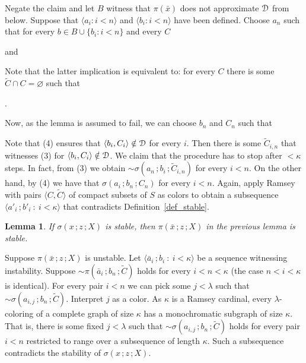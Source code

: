 \documentclass{amsproc}
\makeatletter
\newcounter{thm}
\theoremstyle{mio}
\newtheorem{lemma}[thm]{Lemma}\tcolorboxenvironment{lemma}{mythm}
\providecommand{\proofNameStyle}{\bfseries}
\renewenvironment{proof}[1][\proofname]{\par
  \pushQED{\qed}%
  \normalfont%
  \trivlist
  \item[\hskip\labelsep
        \proofNameStyle
    #1\@addpunct{.}]\ignorespaces
}{%
  \popQED\endtrivlist\@endpefalse
}
\makeatother
\begin{document}
\begin{proof}
  Negate the claim and let $B$ witness that $\pi(\bar x)$ does not approximate ${\EuScript D}$ from below.
  Suppose that $\langle a_i:i<n\rangle$ and $\langle b_i:i<n\rangle$ have been defined.
  Choose $a_n$ such that for every $b\in B\cup\{b_i:i<n\}$ and every $C$

  \quad and

  
  Note that the latter implication is equivalent to: for every $C$ there is some  $\tilde C\cap C=\varnothing$ such that 
  
  .%

  Now, as the lemma is assumed to fail, we can choose $b_n$ and $C_n$ such that


  Note that (4) ensures that $\langle b_i,C_i\rangle\notin{\EuScript D}$ for every $i$.
  Then there is some $\tilde C_{i,n}$ that witnesses (3) for $\langle b_i,C_i\rangle\notin{\EuScript D}$.
  We claim that the procedure has to stop after $<\kappa$ steps.
  In fact, from (3) we obtain ${\sim}\sigma(a_n\,;b_i\,;\tilde C_{i,n})$ for every $i<n$.
  On the other hand, by (4) we have that $\sigma(a_i\,;b_n\,;C_n)$ for every $i<n$.
  Again, apply Ramsey with pairs $\langle C,\tilde C\rangle$ of compact subsets of $S$ as colors to obtain a subsequence $\langle a'_i\,;b'_i\ :\ i<\kappa\rangle$ that contradicts Definition~\ref{def_stable}.
\end{proof}

\begin{lemma}\label{lem_sigma_stable}
  If $\sigma(x\,;z\,;X)$ is stable, then $\pi(\bar x\,;z\,;X)$ in the previous lemma is stable.
\end{lemma}

\begin{proof}
  Suppose $\pi(\bar x\,;z\,;X)$ is unstable.
  Let $\langle \bar a_i\,;b_i\ :\ i<\kappa\rangle$ be a sequence witnessing instability.
  Suppose ${\sim}\pi(\bar a_i\,;b_n\,;\tilde C)$ holds for every $i<n<\kappa$ (the case $n<i<\kappa$ is identical).
  For every pair $i<n$ we can pick some $j<\lambda$ such that ${\sim}\sigma(a_{i,j}\,;b_n\,;\tilde C)$.
  Interpret $j$ as a color. 
  As $\kappa$ is a Ramsey cardinal, every $\lambda$-coloring of a complete graph of size $\kappa$ has a monochromatic subgraph of size $\kappa$.
  That is, there is some fixed $j<\lambda$ such that ${\sim}\sigma(a_{i,j}\,;b_n\,;\tilde C)$ holds for every pair $i<n$ restricted to range over a subsequence of length $\kappa$.
  Such a subsequence contradicts the stability of $\sigma(x\,;z\,;X)$.
\end{proof}
\end{document}
